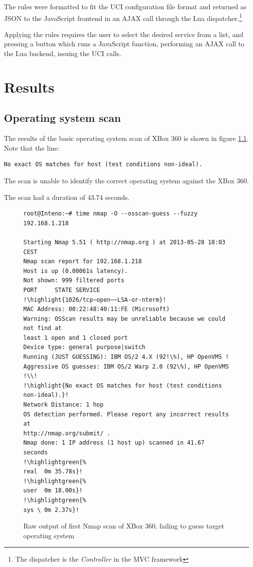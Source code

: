 \documentclass[a4paper,11pt,makeidx]{kth-bcs}
\newcommand{\reducedstrut}{\vrule width 0pt height .9\ht\strutbox depth .9\dp\strutbox\relax}
\newcommand{\highlight}[1]{%
  \begingroup
  \colorbox{light-gray!20}{\footnotesize\ttfamily#1\/}%
  \endgroup
}
\newcommand{\highlightgreen}[1]{%
  \begingroup
  \colorbox{light-green!20}{#1\/}%
  \endgroup
}
\begin{document}
The rules were formatted to fit the UCI configuration file format and returned as JSON to the JavaScript frontend in an AJAX call through the Lua dispatcher.\footnote{The dispatcher is the \emph{Controller} in the MVC framework}

Applying the rules requires the user to select the desired service from a list, and pressing a button which runs a JavaScript function, performing an AJAX call to the Lua backend, issuing the UCI calls.


\chapter{Results}
\section{Operating system scan}
The results of the basic operating system scan of XBox 360 is shown in figure \ref{fig:nmapos}.
Note that the line:
\begin{lstlisting}[escapechar=!]
No exact OS matches for host (test conditions non-ideal).
\end{lstlisting}
    
The scan is unable to identify the correct operating system against the XBox 360.

The scan had a duration of 43.74 seconds.

   \begin{figure}[ht]
      \centering
      \begin{lstlisting}[escapechar=!]
root@Inteno:~# time nmap -O --osscan-guess --fuzzy 192.168.1.218

Starting Nmap 5.51 ( http://nmap.org ) at 2013-05-28 18:03 CEST
Nmap scan report for 192.168.1.218
Host is up (0.00061s latency).
Not shown: 999 filtered ports
PORT     STATE SERVICE
!\highlight{1026/tcp~open~~LSA-or-nterm}!
MAC Address: 00:22:48:40:11:FE (Microsoft)
Warning: OSScan results may be unreliable because we could not find at
least 1 open and 1 closed port
Device type: general purpose|switch
Running (JUST GUESSING): IBM OS/2 4.X (92!\%), HP OpenVMS !
Aggressive OS guesses: IBM OS/2 Warp 2.0 (92\%), HP OpenVMS !\\!
!\highlight{No exact OS matches for host (test conditions non-ideal).}!
Network Distance: 1 hop
OS detection performed. Please report any incorrect results at
http://nmap.org/submit/ .
Nmap done: 1 IP address (1 host up) scanned in 41.67 seconds
!\highlightgreen{%
real  0m 35.78s}!
!\highlightgreen{%
user  0m 18.00s}!
!\highlightgreen{%
sys \ 0m 2.37s}!
      \end{lstlisting}
      \caption{
         \small{
Raw output of first Nmap scan of XBox 360, failing to guess target operating system
         }
      }
      \label{fig:nmapos}
   \end{figure}
\end{document}
